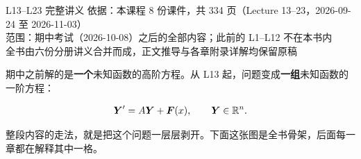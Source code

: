 \documentclass[11pt]{ctexart}
\begin{document}
{L13--L23 完整讲义}%
{依据：本课程 8 份课件，共 334 页（Lecture 13--23，2026-09-24 至 2026-11-03）\\
范围：期中考试（2026-10-08）之后的全部内容；此前的 L1--L12 不在本书内\\
全书由六份分册讲义合并而成，正文推导与各章附录详解均保留原稿}





期中之前解的是\textbf{一个}未知函数的高阶方程。从 L13 起，问题变成\textbf{一组}未知函数的一阶方程：

\[
\boldsymbol{Y}'=A\boldsymbol{Y}+\boldsymbol{F}(x),\qquad \boldsymbol{Y}\in\mathbb{R}^{n}.
\]

整段内容的走法，就是把这个问题一层层剥开。下面这张图是全书骨架，后面每一章都在解释其中一格。
\end{document}
